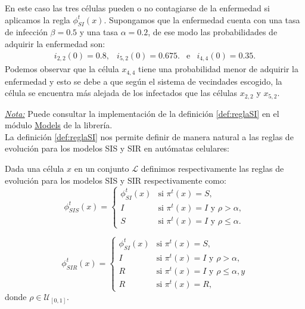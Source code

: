\begin{example}
En este caso las tres células pueden o no contagiarse de la enfermedad si aplicamos la regla $\phi_{SI}^t(x)$. Supongamos que la enfermedad cuenta con una tasa de infección $\beta=0.5$ y una tasa $\alpha=0.2$, de ese modo las probabilidades de adquirir la enfermedad son:
$$\begin{array}{ccccc}
    i_{2,2}(0)=0.8, & i_{5,2}(0)=0.675. & \text{e} & i_{4,4}(0)=0.35.
\end{array}$$
Podemos observar que la célula $x_{4,4}$ tiene una probabilidad menor de adquirir la enfermedad y esto se debe a que según el sistema de vecindades escogido, la célula se encuentra más alejada de los infectados que las células $x_{2,2}$ y $x_{5,2}$.
\end{example}

\underline{\textit{Nota:}} Puede consultar la implementación de la definición \ref{def:reglaSI} en el módulo \href{https://github.com/Grupo-de-simulacion-con-automatas/Prediccion-del-comportamiento-de-una-enfermedad-simulada-en-AC-con-un-algoritmo-en-RN/blob/master/Codigo/CAsimulation/casimulation/Models.py#:~:text=def-,__SI_rule,-(self\%2C\%20cellState\%2C\%20neighborsByImpact}{\underline{Models}} de la librería. \\

La definición \ref{def:reglaSI} nos permite definir de manera natural a las reglas de evolución para los modelos SIS y SIR en autómatas celulares:

\begin{definition}\label{def:reglasSISySIR}
Dada una célula $x$ en un conjunto $\mathcal{L}$ definimos respectivamente las reglas de evolución para los modelos SIS y SIR respectivamente como:
\begin{equation}
    \phi_{SIS}^t(x)=\left\{\begin{array}{ll}
        \phi_{SI}^t(x) & \text{si }\pi^t(x) = S,\\
        I & \text{si }\pi^t(x)=I\text{ y }\rho>\alpha,\\
        S & \text{si }\pi^t(x)=I\text{ y }\rho\leq\alpha.
    \end{array}\right.
\end{equation}

\begin{equation}
    \phi_{SIR}^t(x)=\left\{\begin{array}{ll}
        \phi_{SI}^t(x) & \text{si }\pi^t(x) = S,\\
        I & \text{si }\pi^t(x)=I\text{ y }\rho>\alpha,\\
        R & \text{si }\pi^t(x)=I\text{ y }\rho\leq\alpha, y \\
        R & \text{si }\pi^t(x)=R,
    \end{array}\right.
\end{equation}
donde $\rho\in\mathcal{U}_{[0,1]}$.
\end{definition}


